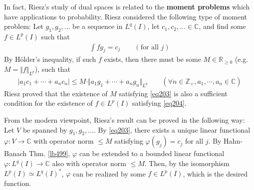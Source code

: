 \documentclass[12pt,b5paper,notitlepage]{article}
\theoremstyle{definition}
\theoremstyle{plain}
\newcommand{\Cbb}{\mathbb C}
\newcommand{\Zbb}{\mathbb Z}
\newcommand{\Rbb}{\mathbb R}
\numberwithin{equation}{section}
\begin{document}
In fact, Riesz's study of dual spaces is related to the \textbf{moment problems} which have applications to probability. Riesz considered the following type of moment problem: Let $g_1,g_2,\dots$ be a sequence in $L^q(I)$, let $c_1,c_2,\dots\in\Cbb$, and find some $f\in L^p(I)$ such that
\begin{align}
\int fg_j=c_j\qquad(\text{for all } j) \label{eq204}
\end{align}
By H\"older's inequality, if such $f$ exists, then there must be some $M\in\Rbb_{\geq0}$ (e.g. $M=\Vert f\Vert_{L^p}$), such that 
\begin{align}\label{eq203}
|a_1c_1+\cdots+a_nc_n|\leq M\cdot \Vert a_1g_1+\cdots+a_ng_n\Vert_{L^q}\qquad(\forall n\in\Zbb_+,a_1,\cdots,a_n\in\Cbb)
\end{align}
Riesz proved that the existence of $M$ satisfying \eqref{eq203} is also a sufficient condition for the existence of $f\in L^p(I)$ satisfying \eqref{eq204}. 

From the modern viewpoint, Riesz's result can be proved in the following way: Let $V$ be spanned by $g_1,g_2,\dots$. By \eqref{eq203}, there exists a unique linear functional $\varphi:V\rightarrow\Cbb$ with operator norm $\leq M$ satisfying $\varphi(g_j)=c_j$ for all $j$. By Hahn-Banach Thm. \ref{lb499}, $\varphi$ can be extended to a bounded linear functional $\varphi:L^q(I)\rightarrow\Cbb$ also with operator norm $\leq M$. Then, by the isomorphism $L^p(I)\simeq L^q(I)^*$, $\varphi$ can be realized by some $f\in L^p(I)$, which is the desired function.
\end{document}
